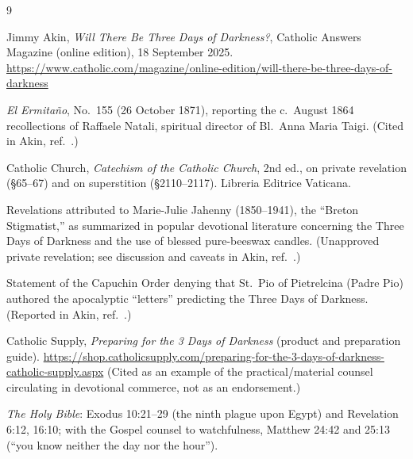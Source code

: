 \documentclass[11pt]{article}
\begin{document}
\begin{thebibliography}{9}

Jimmy Akin,
\emph{Will There Be Three Days of Darkness?},
Catholic Answers Magazine (online edition), 18 September 2025.
\url{https://www.catholic.com/magazine/online-edition/will-there-be-three-days-of-darkness}

\emph{El Ermitaño}, No.\ 155 (26 October 1871), reporting the c.\ August 1864
recollections of Raffaele Natali, spiritual director of Bl.\ Anna Maria Taigi.
(Cited in Akin, ref.\ \cite{akin}.)

Catholic Church,
\emph{Catechism of the Catholic Church}, 2nd ed.,
on private revelation (\S 65--67) and on superstition (\S 2110--2117).
Libreria Editrice Vaticana.

Revelations attributed to Marie-Julie Jahenny (1850--1941), the ``Breton
Stigmatist,'' as summarized in popular devotional literature concerning the
Three Days of Darkness and the use of blessed pure-beeswax candles.
(Unapproved private revelation; see discussion and caveats in Akin, ref.\ \cite{akin}.)

Statement of the Capuchin Order denying that St.\ Pio of Pietrelcina (Padre
Pio) authored the apocalyptic ``letters'' predicting the Three Days of
Darkness. (Reported in Akin, ref.\ \cite{akin}.)

Catholic Supply,
\emph{Preparing for the 3 Days of Darkness} (product and preparation guide).
\url{https://shop.catholicsupply.com/preparing-for-the-3-days-of-darkness-catholic-supply.aspx}
(Cited as an example of the practical/material counsel circulating in devotional commerce, not as an endorsement.)

\emph{The Holy Bible}: Exodus 10:21--29 (the ninth plague upon Egypt) and
Revelation 6:12, 16:10; with the Gospel counsel to watchfulness,
Matthew 24:42 and 25:13 (``you know neither the day nor the hour'').

\end{thebibliography}
\end{document}
